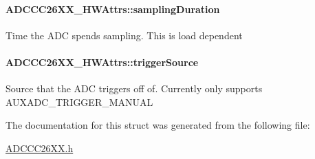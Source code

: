 \paragraph[{sampling\+Duration}]{ A\+D\+C\+C\+C26\+X\+X\+\_\+\+H\+W\+Attrs\+::sampling\+Duration}\label{struct_a_d_c_c_c26_x_x___h_w_attrs_a3a2bdb16efd6a7b9cd8bc32bea0cf3f2}
Time the A\+D\+C spends sampling. This is load dependent 
\paragraph[{trigger\+Source}]{ A\+D\+C\+C\+C26\+X\+X\+\_\+\+H\+W\+Attrs\+::trigger\+Source}\label{struct_a_d_c_c_c26_x_x___h_w_attrs_a0951f527dea50a156570e1a3055db84c}
Source that the A\+D\+C triggers off of. Currently only supports A\+U\+X\+A\+D\+C\+\_\+\+T\+R\+I\+G\+G\+E\+R\+\_\+\+M\+A\+N\+U\+A\+L 

The documentation for this struct was generated from the following file\+:\begin{DoxyCompactItemize}
\item 
\hyperlink{_a_d_c_c_c26_x_x_8h}{A\+D\+C\+C\+C26\+X\+X.\+h}\end{DoxyCompactItemize}
